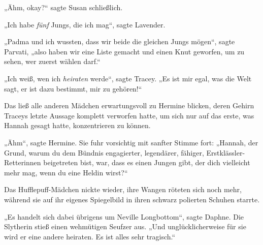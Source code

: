 „Ähm, okay?“ sagte Susan schließlich.

„Ich habe \emph{fünf} Jungs, die ich mag“, sagte Lavender.

„Padma und ich wussten, dass wir beide die gleichen Jungs mögen“, sagte Parvati, „also haben wir eine Liste gemacht und einen Knut geworfen, um zu sehen, wer zuerst wählen darf.“

„Ich weiß, wen ich \emph{heiraten} werde“, sagte Tracey. „Es ist mir egal, was die Welt sagt, er ist dazu bestimmt, mir zu gehören!“

Das ließ alle anderen Mädchen erwartungsvoll zu Hermine blicken, deren Gehirn Traceys letzte Aussage komplett verworfen hatte, um sich nur auf das erste, was Hannah gesagt hatte, konzentrieren zu können.

„Ähm“, sagte Hermine. Sie fuhr vorsichtig mit sanfter Stimme fort: „Hannah, der Grund, warum du dem Bündnis engagierter, legendärer, fähiger, Erstklässler-Retterinnen beigetreten bist, war, dass es einen Jungen gibt, der dich vielleicht mehr mag, wenn du eine Heldin wirst?“

Das Hufflepuff-Mädchen nickte wieder, ihre Wangen röteten sich noch mehr, während sie auf ihr eigenes Spiegelbild in ihren schwarz polierten Schuhen starrte.

„Es handelt sich dabei übrigens um Neville Longbottom“, sagte Daphne. Die Slytherin stieß einen wehmütigen Seufzer aus. „Und unglücklicherweise für sie wird er eine andere heiraten. Es ist alles sehr tragisch.“


